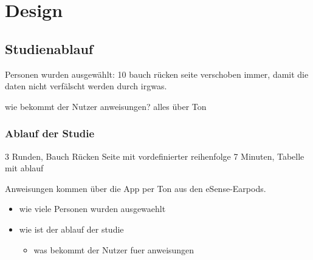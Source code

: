 \chapter{Design}
\label{ch:Design}

\section{Studienablauf}
Personen wurden ausgewählt: 10
bauch rücken seite verschoben immer, damit die daten nicht verfälscht werden durch irgwas.

wie bekommt der Nutzer anweisungen? alles über Ton

\subsection{Ablauf der Studie}
3 Runden, Bauch Rücken Seite mit vordefinierter reihenfolge
7 Minuten, Tabelle mit ablauf

Anweisungen kommen über die App per Ton aus den eSense-Earpods.

\begin{itemize}
    \item wie viele Personen wurden ausgewaehlt
    \item wie ist der ablauf der studie
    \begin{itemize}
        \item was bekommt der Nutzer fuer anweisungen
    \end{itemize}
\end{itemize}
